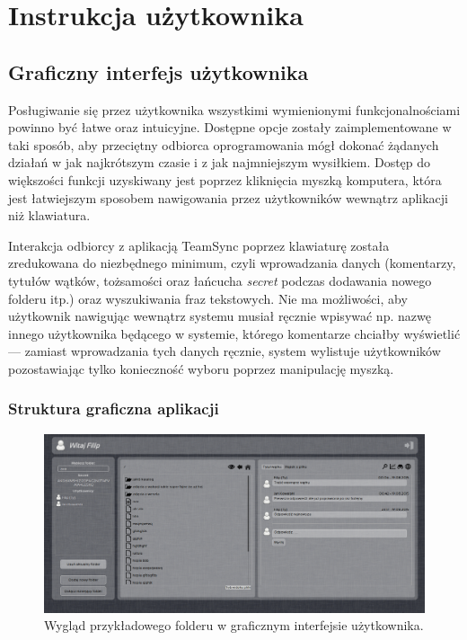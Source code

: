 \chapter{Instrukcja użytkownika}

\section{Graficzny interfejs użytkownika}

\label{gui}

Posługiwanie się przez użytkownika wszystkimi wymienionymi funkcjonalnościami powinno być łatwe oraz intuicyjne. Dostępne opcje zostały zaimplementowane w taki sposób, aby przeciętny odbiorca oprogramowania mógł dokonać żądanych działań w jak najkrótszym czasie i z jak najmniejszym wysiłkiem. Dostęp do większości funkcji uzyskiwany jest poprzez kliknięcia myszką komputera, która jest łatwiejszym sposobem nawigowania przez użytkowników wewnątrz aplikacji niż klawiatura.

Interakcja odbiorcy z aplikacją TeamSync poprzez klawiaturę została zredukowana do niezbędnego minimum, czyli wprowadzania danych (komentarzy, tytułów wątków, tożsamości oraz łańcucha \emph{secret} podczas dodawania nowego folderu itp.) oraz wyszukiwania fraz tekstowych. Nie ma możliwości, aby użytkownik nawigując wewnątrz systemu musiał ręcznie wpisywać np. nazwę innego użytkownika będącego w systemie, którego komentarze chciałby wyświetlić --- zamiast wprowadzania tych danych ręcznie, system wylistuje użytkowników pozostawiając tylko konieczność wyboru poprzez manipulację myszką.

\subsection*{Struktura graficzna aplikacji}

\begin{figure}[htb]
  \vspace{5pt}
  \begin{center}
    \includegraphics[width=400pt]{figures/filescomments.png}
  \end{center}
  \caption{Wygląd przykładowego folderu w graficznym interfejsie użytkownika.}
\end{figure}

